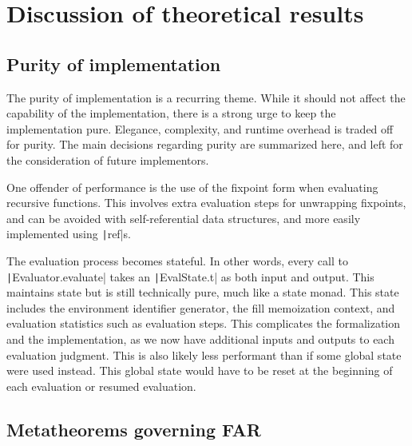 \chapter{Discussion of theoretical results}
\label{sec:discussion}

\section{Purity of implementation}
\label{sec:env-purity}
The purity of implementation is a recurring theme. While it should not affect the capability of the implementation, there is a strong urge to keep the implementation pure. Elegance, complexity, and runtime overhead is traded off for purity. The main decisions regarding purity are summarized here, and left for the consideration of future implementors.

One offender of performance is the use of the fixpoint form when evaluating recursive functions. This involves extra evaluation steps for unwrapping fixpoints, and can be avoided with self-referential data structures, and more easily implemented using \texttt|ref|s.

The evaluation process becomes stateful. In other words, every call to \texttt|Evaluator.evaluate| takes an \texttt|EvalState.t| as both input and output. This maintains state but is still technically pure, much like a state monad. This state includes the environment identifier generator, the fill memoization context, and evaluation statistics such as evaluation steps. This complicates the formalization and the implementation, as we now have additional inputs and outputs to each evaluation judgment. This is also likely less performant than if some global state were used instead. This global state would have to be reset at the beginning of each evaluation or resumed evaluation.

\section{Metatheorems governing FAR}
\label{sec:far-meta}





